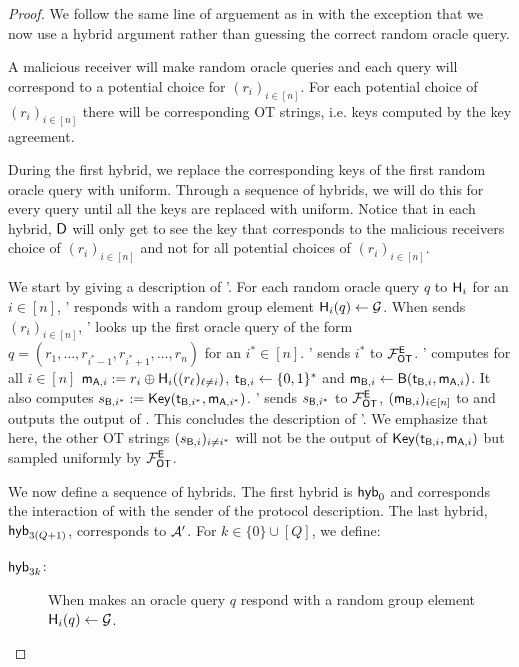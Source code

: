 \begin{proof}
We follow the same line of arguement as in  with the exception that we now use a hybrid argument rather than guessing the correct random oracle query. 

A malicious receiver will make random oracle queries and each query will correspond to a potential choice for $(r_i)_{i\in[n]}$. For each potential choice of $(r_i)_{i\in[n]}$ there will be corresponding OT strings, i.e. keys computed by the key agreement.
 
During the first hybrid, we replace the corresponding keys of the first random oracle query with uniform. Through a sequence of hybrids, we will do this for every query until all the keys are replaced with uniform. Notice that in each hybrid, $\mathsf D$ will only get to see the key that corresponds to the malicious receivers choice of $(r_i)_{i\in[n]}$ and not for all potential choices of $(r_i)_{i\in[n]}$.


We start by giving a description of \Adv'. For each random oracle query $q$ to $\mathsf{H}_i$ for an $i\in[n]$, \Adv' responds with a random group element $\mathsf{H}_i(q)\leftarrow\mathcal{G}$.
 When \Adv sends $(r_i)_{i\in[n]}$, \Adv' looks up the first oracle query of the form $q= (r_1,\dots, r_{i^*-1},r_{i^*+1},\dots, r_{n})$ for an $i^*\in[n]$. \Adv' sends $i^*$ to $\mathcal{F}_{\mathsf{OT}}^\mathsf{E}$. \Adv' computes for all $i\in[n]$ $\mathsf{m}_{\mathsf{A},i}:=r_i\oplus\mathsf{H}_i((r_\ell)_{\ell\neq i})$, $\mathsf{t}_{\mathsf{B},i}\leftarrow\{0,1\}^*$ and $\mathsf{m}_{\mathsf{B},i}\leftarrow\mathsf{B}(\mathsf{t}_{\mathsf{B},i},\mathsf{m}_{\mathsf{A},i})$. It also computes $s_{\mathsf{B},i^*}:=\mathsf{Key}(\mathsf{t}_{\mathsf{B},i^*},\mathsf{m}_{\mathsf{A},i^*})$.
\Adv' sends $s_{\mathsf{B},i^*}$ to $\mathcal{F}_{\mathsf{OT}}^\mathsf{E}$, $(\mathsf{m}_{\mathsf{B},i})_{i\in[n]}$ to \Adv and outputs the output of \Adv. This concludes the description of \Adv'. We emphasize that here, the other OT strings $(s_{\mathsf{B},i})_{i\neq i^*}$ will not be the output of $\mathsf{Key}(\mathsf{t}_{\mathsf{B},i},\mathsf{m}_{\mathsf{A},i})$ but sampled uniformly by $\mathcal{F}_{\mathsf{OT}}^\mathsf{E}$.

We now define a sequence of hybrids. The first hybrid is $\mathsf{hyb}_0$ and corresponds the interaction of \Adv with the sender of the protocol description. The last hybrid, $\mathsf{hyb}_{3(Q+1)}$, corresponds to $\mathcal{A}'$.
For $k\in\{0\}\cup[Q]$, we define:
\begin{description}
\item[$\mathsf{hyb}_{3k}$:]  When \Adv makes an oracle query $q$ respond with a random group element $\mathsf{H}_i(q)\leftarrow\mathcal{G}$. 


\end{description}
\end{proof}
